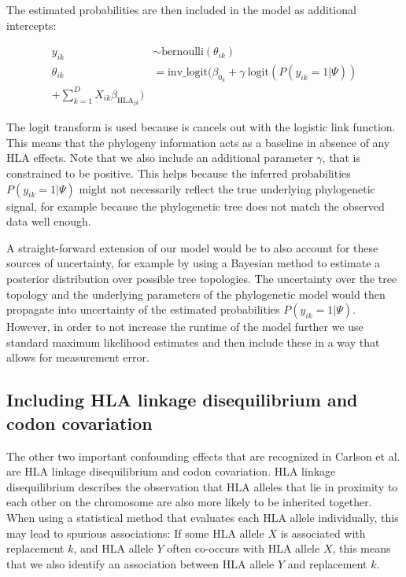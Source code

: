 \documentclass[fleqn,11pt]{SelfArx} %
\begin{document}
The estimated probabilities are then included in the model as additional intercepts:

\begin{equation}
\begin{aligned}
  y_{ik} & \sim \text{bernoulli}(\theta_{ik}) \\
  \theta_{ik} & = \text{inv\_logit}(\beta_{0_{k}} + \gamma~\text{logit}(P(y_{ik}=1|\Psi)) \\ + \sum_{k=1}^{D}X_{ik}\beta_{\text{HLA}_{jk}})
\end{aligned}
\end{equation}

The logit transform is used because is cancels out with the logistic link function. This means that the phylogeny information acts as a baseline in absence of any HLA effects. Note that we also include an additional parameter \(\gamma\), that is constrained to be positive. This helps because the inferred probabilities \(P(y_{ik}=1|\Psi)\) might not necessarily reflect the true underlying phylogenetic signal, for example because the phylogenetic tree does not match the observed data well enough.

A straight-forward extension of our model would be to also account for these sources of uncertainty, for example by using a Bayesian method to estimate a posterior distribution over possible tree topologies. The uncertainty over the tree topology and the underlying parameters of the phylogenetic model would then propagate into uncertainty of the estimated probabilities \(P(y_{ik}=1|\Psi)\). However, in order to not increase the runtime of the model further we  use standard maximum likelihood estimates and then include these in a way that allows for measurement error.

\subsection*{Including HLA linkage disequilibrium and codon covariation}

The other two important confounding effects that are recognized in Carlson et al.\cite{Carlson2008} are HLA linkage disequilibrium and codon covariation.
HLA linkage disequilibrium describes the observation that HLA alleles that lie in proximity to each other on the chromosome are also more likely to be inherited together. When using a statistical method that evaluates each HLA allele individually, this may lead to spurious associations: If some HLA allele \(X\) is associated with replacement \(k\), and HLA allele \(Y\) often co-occurs with HLA allele \(X\), this means that we also identify an association between HLA allele \(Y\) and replacement \(k\).
\end{document}
